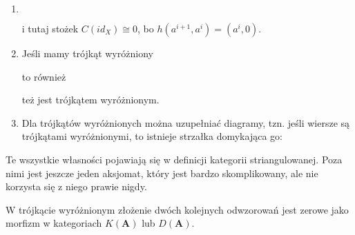 \begin{fact}\label{fakt 11.2}$ $\newline
  \begin{enumerate}[label=(\alph*)]
    \item $ $\newline
      \begin{center}\end{center}
      i tutaj stożek $C(id_X)\cong 0$, bo $h(a^{i+1}, a^i)=(a^i, 0)$.
    \item Jeśli mamy trójkąt wyróżniony
      \begin{center}\end{center}
      to również 
      \begin{center}\end{center}
      też jest trójkątem wyróżnionym.
    \item Dla trójkątów wyróżnionych można uzupełniać diagramy, tzn. jeśli wiersze są trójkątami wyróżnionymi, to istnieje strzałka domykająca go:
      \begin{center}\end{center}
  \end{enumerate}
\end{fact}

Te wszystkie własności pojawiają się w definicji kategorii striangulowanej. Poza nimi jest jeszcze jeden aksjomat, który jest bardzo skomplikowany, ale nie korzysta się z niego prawie nigdy.

\begin{lemma}
  W trójkącie wyróżnionym złożenie dwóch kolejnych odwzorowań jest zerowe jako morfizm w kategoriach $K(\mathbf{A})$ lub $D(\mathbf{A})$.
\end{lemma}

